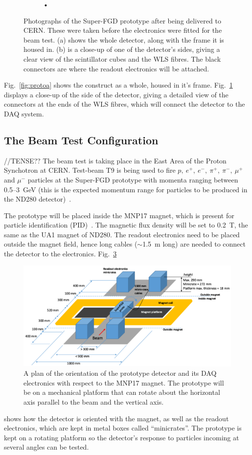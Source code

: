 \documentclass[aps,pra,12pt,notitlepage,tightenlines]{revtex4-1}
\begin{document}
\begin{figure}
\begin{subfigure}{.5\textwidth}
   \caption{•}
   \label{fig:protob}
  \end{subfigure}
  \caption{Photographs of the Super-FGD prototype after being delivered to CERN. These were taken before the electronics were fitted for the beam test. (a) shows the whole detector, along with the frame it is housed in. (b) is a close-up of one of the detector's sides, giving a clear view of the scintillator cubes and the WLS fibres. The black connectors are where the readout electronics will be attached.}
  \label{fig:proto}
 \end{figure}
Fig.\ \ref{fig:protoa} shows the construct as a whole, housed in it's frame. Fig.\ \ref{fig:protob} displays a close-up of the side of the detector, giving a detailed view of the connectors at the ends of the WLS fibres, which will connect the detector to the DAQ system.

\subsection{The Beam Test Configuration} //TENSE??
The beam test is taking place in the East Area of the Proton Synchotron at CERN. Test-beam T9 is being used to fire $p, \ e^+, \ e^-, \ \pi^+, \ \pi^-, \ \mu^+$ and $\mu^-$ particles at the Super-FGD prototype with momenta ranging between 0.5--3~GeV (this is the expected momentum range for particles to be produced in the ND280 detector)~\cite{Durieu2001}. 

The prototype will be placed inside the MNP17 magnet, which is present for particle identification (PID)~\cite{Brooks2015}. The magnetic flux density will be set to 0.2~T, the same as the UA1 magnet of ND280. The readout electronics need to be placed outside the magnet field, hence long cables ($\sim$1.5~m long) are needed to connect the detector to the electronics. Fig.\ \ref{fig:plat}
\begin{figure}
 \includegraphics[scale=0.8]{platform}
 \caption{A plan of the orientation of the prototype detector and its DAQ electronics with respect to the MNP17 magnet. The prototype will be on a mechanical platform that can rotate about the horizontal axis parallel to the beam and the vertical axis.}
 \label{fig:plat}
\end{figure}
shows how the detector is oriented with the magnet, as well as the readout electronics, which are kept in metal boxes called ``minicrates''. The prototype is kept on a rotating platform so the detector's response to particles incoming at several angles can be tested.
\end{document}
